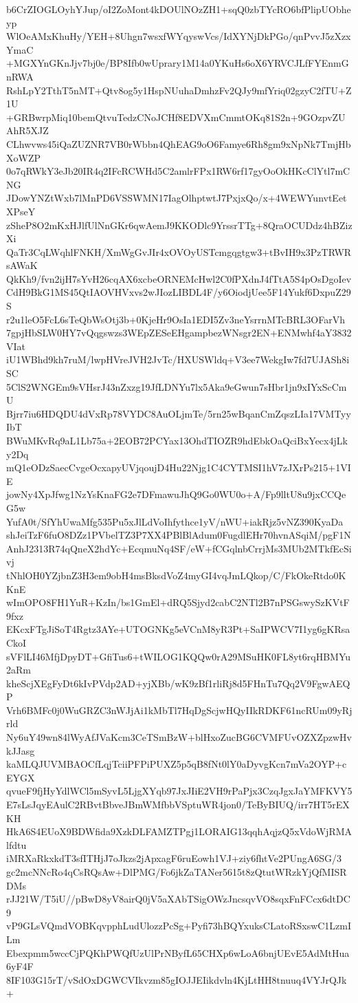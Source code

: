 b6CrZIOGLOyhYJup/oI2ZoMont4kDOUlNOzZH1+sqQ0zbTYcRO6bfPlipUObheyp
WlOeAMxKhuHy/YEH+8Uhgn7wsxfWYqyswVcs/IdXYNjDkPGo/qnPvvJ5zXzxYmaC
+MGXYnGKnJjv7bj0e/BP8Ifb0wUprary1M14a0YKuHs6oX6YRVCJLfFYEnmGnRWA
RshLpY2TthT5nMT+Qtv8og5y1HspNUuhaDmhzFv2QJy9mfYriq02gzyC2fTU+Z1U
+GRBwrpMiq10bemQtvuTedzCNoJCHf8EDVXmCmmtOKq81S2n+9GOzpvZUAhR5XJZ
CLhwvws45iQaZUZNR7VB0rWbbn4QhEAG9oO6Famye6Rh8gm9xNpNk7TmjHbXoWZP
0o7qRWkY3eJb20IR4q2IFcRCWHd5C2amlrFPx1RW6rf17gyOoOkHKcClYtl7mCNG
JDowYNZtWxb7lMnPD6VSSWMN17IagOlhptwtJ7PxjxQo/x+4WEWYunvtEetXPseY
zSheP8O2mKxHJlfUlNnGKr6qwAemJ9KKODlc9YrssrTTg+8QraOCUDdz4hBZizXi
QaTr3CqLWqhlFNKH/XmWgGvJIr4xOVOyUSTcmgqgtgw3+tBvIH9x3PzTRWRsAWaK
QkKh9/fvn2ijH7sYvH26cqAX6xcbeORNEMcHwl2C0fPXdnJ4fTtA5S4pOsDgoIev
CdH9BkG1MS45QtIAOVHVxvs2wJIozLIBDL4F/y6OiodjUee5F14Yukf6DxpuZ29S
r2u1leO5FcL6sTeQbWsOtj3b+0KjeHr9OsIa1EDI5Zv3neYsrrnMTcBRL3OFarVh
7gpjHbSLW0HY7vQqgswzs3WEpZESeEHgampbezWNsgr2EN+ENMwhf4aY3832VIat
iU1WBhd9kh7ruM/lwpHVreJVH2JvTc/HXUSWldq+V3ee7WekgIw7fd7UJASh8iSC
5ClS2WNGEm9sVHsrJ43nZxzg19JfLDNYu7lx5Aka9eGwun7sHbr1jn9xIYxScCmU
Bjrr7iu6HDQDU4dVxRp78VYDC8AuOLjmTe/5rn25wBqanCmZqszLIa17VMTyyIbT
BWuMKvRq9aL1Lb75a+2EOB72PCYax13OhdTIOZR9hdEbkOaQciBxYecx4jLky2Dq
mQ1eODzSaecCvgeOcxapyUVjqoujD4Hu22Njg1C4CYTMSI1hV7zJXrPs215+1VIE
jowNy4XpJfwg1NzYsKnaFG2e7DFmawuJhQ9Go0WU0o+A/Fp9lltU8u9jxCCQeG5w
YufA0t/SfYhUwaMfg535Pu5xJlLdVoIhfythce1yV/nWU+iakRjz5vNZ390KyaDa
shJeiTzF6fuO8DZz1PVbelTZ3P7XX4PBlBlAdum0FugdlEHr70hvnASqiM/pgF1N
AnhJ2313R74qQneX2hdYc+EcqmuNq4SF/eW+fCGqlnbCrrjMs3MUb2MTkfEcSivj
tNhlOH0YZjbnZ3H3em9obH4msBksdVoZ4myGI4vqJmLQkop/C/FkOkeRtdo0KKnE
wImOPO8FH1YuR+KzIn/bs1GmEl+dRQ5Sjyd2cabC2NTl2B7nPSGswySzKVtF9fxz
EKcxFTgJiSoT4Rgtz3AYe+UTOGNKg5eVCnM8yR3Pt+SaIPWCV7I1yg6gKRsaCkoI
sVFlLI46MfjDpyDT+GfiTus6+tWILOG1KQQw0rA29MSuHK0FL8yt6rqHBMYu2aRm
kheScjXEgFyDt6kIvPVdp2AD+yjXBb/wK9zBf1rliRj8d5FHnTu7Qq2V9FgwAEQP
Vrh6BMFc0j0WuGRZC3nWJjAi1kMbTl7HqDgScjwHQyIIkRDKF61ncRUm09yRjrld
Ny6uY49wn84lWyAfJVaKcm3CeTSmBzW+blHxoZucBG6CVMFUvOZXZpzwHvkJJasg
kaMLQJUVMBAOCfLqjTciiPFPiPUXZ5p5qB8fNt0lY0aDyvgKcn7mVa2OYP+cEYGX
qvueF9fjHyYdlWCl5mSyvL5LjgXYqb97JxJIiE2VH9rPaPjx3CzqJgxJaYMFKVY5
E7sLsJqyEAulC2RBvtBbveJBmWMfbbVSptuWR4jon0/TeByBIUQ/irr7HT5rEXKH
HkA6S4EUoX9BDWfida9XzkDLFAMZTPgj1LORAIG13qqhAqjzQ5xVdoWjRMAlfdtu
iMRXaRkxkdT3sfITHjJ7oJkzs2jApxagF6ruEowh1VJ+ziy6fhtVe2PUngA6SG/3
gc2mcNNcRo4qCsRQsAw+DlPMG/Fo6jkZaTANer5615t8zQtutWRzkYjQfMISRDMs
rJJ21W/T5iU//pBwD8yV8airQ0jV5aXAbTSigOWzJncsqvVO8sqxFnFCcx6dtDC9
vP9GLsVQmdVOBKqvpphLudUlozzPcSg+Pyfi73hBQYxuksCLatoRSxswC1LzmILm
Ebexpmm5wccCjPQKhPWQfUzUlPrNByfL65CHXp6wLoA6bnjUEvE5AdMtHua6yF4F
8IF103G15rT/vSdOxDGWCVIkvzm85gIOJJEIikdvln4KjLtHH8tnuuq4VYJrQJk+
